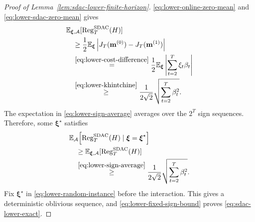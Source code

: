 \documentclass[journal]{IEEEtran}
\theoremstyle{remark}
\newcommand{\RegSDAC}[1]{\operatorname{Reg}_{#1}^{\mathrm{SDAC}}}
\begin{document}
\begin{proof}[Proof of Lemma~\ref{lem:sdac-lower-finite-horizon}]
\eqref{eq:lower-online-zero-mean} and \eqref{eq:lower-sdac-zero-mean} gives
\begin{equation}
\label{eq:lower-sign-average}
\begin{aligned}
&\mathbb{E}_{\boldsymbol{\xi},\mathcal{A}}[\RegSDAC{T}(H)]\\
&\quad\ge\frac12\mathbb{E}_{\boldsymbol{\xi}}
\left|J_T(\mathbf{m}^{(0)})-J_T(\mathbf{m}^{(1)})\right|\\
&\quad\overset{\eqref{eq:lower-cost-difference}}{=}
\frac12\mathbb{E}_{\boldsymbol{\xi}}
\left|\sum_{t=2}^T\xi_t\beta_t\right|\\
&\quad\overset{\eqref{eq:lower-khintchine}}{\ge}\frac{1}{2\sqrt2}
\sqrt{\sum_{t=2}^T\beta_t^2}.
\end{aligned}
\end{equation}
The expectation in \eqref{eq:lower-sign-average} averages over the $2^T$
sign sequences. Therefore, some $\boldsymbol{\xi}^\star$ satisfies
\begin{equation}
\label{eq:lower-fixed-sign-bound}
\begin{aligned}
&\mathbb{E}_{\mathcal{A}}\!\left[
\RegSDAC{T}(H)\mid\boldsymbol{\xi}=\boldsymbol{\xi}^\star\right]\\
&\quad\ge
\mathbb{E}_{\boldsymbol{\xi},\mathcal{A}}[\RegSDAC{T}(H)]\\
&\quad\overset{\eqref{eq:lower-sign-average}}{\ge}
\frac{1}{2\sqrt2}\sqrt{\sum_{t=2}^T\beta_t^2}.
\end{aligned}
\end{equation}
Fix $\boldsymbol{\xi}^\star$ in \eqref{eq:lower-random-instance} before the
interaction. This gives a deterministic oblivious sequence, and
\eqref{eq:lower-fixed-sign-bound} proves \eqref{eq:sdac-lower-exact}.
\end{proof}
\end{document}
